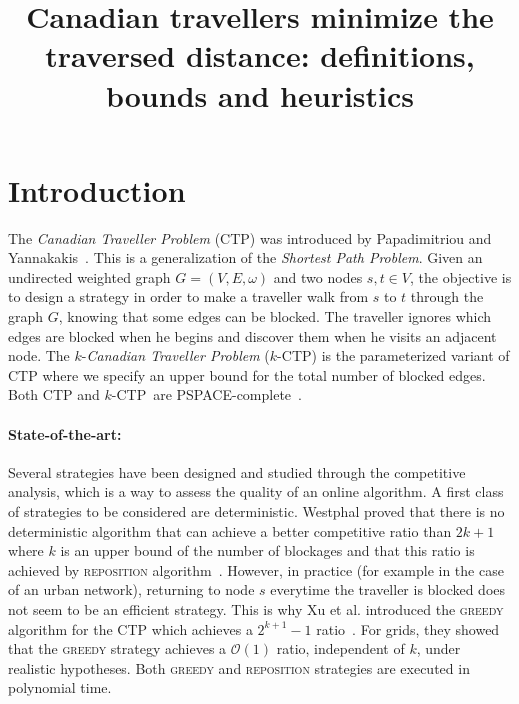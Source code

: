 \documentclass[letter-size, 11pt]{article}
\newcommand{\kctp}{$k$-CTP}
\begin{document}
\title{Canadian travellers minimize the traversed distance: definitions, bounds and heuristics}

\maketitle





\section{Introduction}

The \textit{Canadian Traveller Problem} (CTP) was introduced by Papadimitriou and Yannakakis~\cite{PaYa91}. This is a generalization of the \textit{Shortest Path Problem}. Given an undirected weighted graph $G=(V,E,\omega)$ and two nodes $s,t \in V$, the objective is to design a strategy in order to make a traveller walk from $s$ to $t$ through the graph $G$, knowing that some edges can be blocked. The traveller ignores which edges are blocked when he begins and discover them when he visits an adjacent node. The $k$-\textit{Canadian Traveller Problem} (\kctp) is the parameterized variant of CTP where we specify an upper bound for the total number of blocked edges. Both CTP and \kctp ~are PSPACE-complete~\cite{BaSc91,PaYa91}.

\paragraph{State-of-the-art:}Several strategies have been designed and studied through the competitive analysis, which is a way to assess the quality of an online algorithm. A first class of strategies to be considered are deterministic. Westphal proved that there is no deterministic algorithm that can achieve a better competitive ratio than $2k+1$ where $k$ is an upper bound of the number of blockages and that this ratio is achieved by \textsc{reposition} algorithm~\cite{We08}. However, in practice (for example in the case of an urban network), returning to node $s$ everytime the traveller is blocked does not seem to be an efficient strategy. This is why Xu et al. introduced the \textsc{greedy} algorithm for the CTP which achieves a $2^{k+1}-1$ ratio~\cite{XuHuSuZh09}. For grids, they showed that the \textsc{greedy} strategy achieves a $\mathcal{O}\left(1\right)$ ratio, independent of $k$, under realistic hypotheses. Both \textsc{greedy} and \textsc{reposition} strategies are executed in polynomial time.
\end{document}
